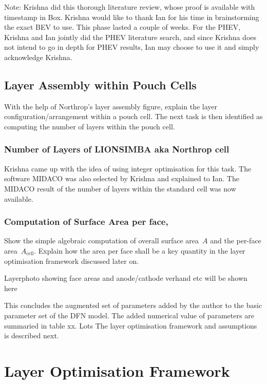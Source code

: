Note: Krishna did this thorough literature review, whose proof is available with
timestamp in Box. Krishna would like to  thank Ian for his time in brainstorming
the exact BEV to use. This phase lasted a couple of weeks. For the PHEV, Krishna
and  Ian jointly  did the  PHEV literature  search, and  since Krishna  does not
intend to  go in depth  for PHEV results,  Ian may choose  to use it  and simply
acknowledge Krishna.

\subsection{Layer Assembly within Pouch Cells}
With  the  help   of  Northrop's  layer  assembly  figure,   explain  the  layer
configuration/arrangement within a pouch cell.  The next task is then identified
as computing the number of layers within the pouch cell.

\subsubsection*{Number of Layers of LIONSIMBA aka Northrop cell}
Krishna came up with  the idea of using integer optimisation  for this task. The
software MIDACO  was also selected by  Krishna and explained to  Ian. The MIDACO
result of the number of layers within the standard cell was now available.

\subsubsection*{Computation of Surface Area per face,~}
Show  the simple  algebraic  computation of  overall surface  area~$A$ and  the
per-face area~$A_\text{cell}$. Explain  how the  area per face  shall be  a key
quantity in the layer optimisation framework discussed later on.

Layerphoto showing face areas and anode/cathode verhand etc will be shown here

This concludes the augmented set of parameters  added by the author to the basic
parameter set  of the  DFN model.  The added numerical  value of  parameters are
summaried in table xx. Lots The  layer optimisation framework and assumptions is
described next. %

\section{Layer Optimisation Framework}

